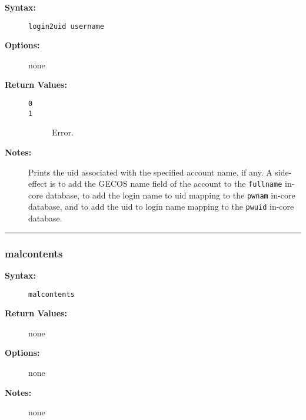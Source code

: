 \begin{description}
\item[{\bf Syntax:}] \mbox{}

{\tt login2uid username}

\item[{\bf Options:}] \mbox{}

none  

\item[{\bf Return Values:}] \mbox{}

\begin{description}
\item[{\tt 0}] \mbox{}



\item[{\tt 1}] \mbox{}

Error.

\end{description}


\item[{\bf Notes:}] \mbox{}

Prints the uid associated with the specified
account name, if any. A side-effect is to add the GECOS name field of 
the account to the {\tt fullname} in-core database, to add the login 
name to uid mapping to the {\tt pwnam} in-core database, and to add 
the uid to login name mapping to the {\tt pwuid} in-core database.

\end{description}


\hrule
\subsubsection{malcontents}

\begin{description}
\item[{\bf Syntax:}] \mbox{}

{\tt malcontents}

\item[{\bf Return Values:}] \mbox{}

none  

\item[{\bf Options:}] \mbox{}

none  

\item[{\bf Notes:}] \mbox{}

none  

\end{description}


